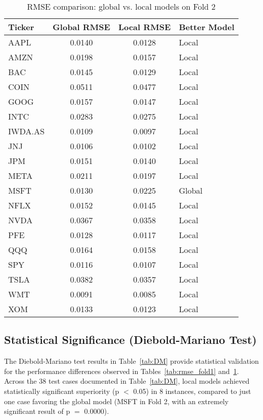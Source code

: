 \documentclass[12pt]{report}
\begin{document}
\begin{table}[h]
\centering
\small
\begin{tabular}{|l|c|c|l|}
\hline
\textbf{Ticker} & \textbf{Global RMSE} & \textbf{Local RMSE} & \textbf{Better Model} \\
\hline
AAPL & 0.0140 & 0.0128 & Local \\
AMZN & 0.0198 & 0.0157 & Local \\
BAC & 0.0145 & 0.0129 & Local \\
COIN & 0.0511 & 0.0477 & Local \\
GOOG & 0.0157 & 0.0147 & Local \\
INTC & 0.0283 & 0.0275 & Local \\
IWDA.AS & 0.0109 & 0.0097 & Local \\
JNJ & 0.0106 & 0.0102 & Local \\
JPM & 0.0151 & 0.0140 & Local \\
META & 0.0211 & 0.0197 & Local \\
MSFT & 0.0130 & 0.0225 & Global \\
NFLX & 0.0152 & 0.0145 & Local \\
NVDA & 0.0367 & 0.0358 & Local \\
PFE & 0.0128 & 0.0117 & Local \\
QQQ & 0.0164 & 0.0158 & Local \\
SPY & 0.0116 & 0.0107 & Local \\
TSLA & 0.0382 & 0.0357 & Local \\
WMT & 0.0091 & 0.0085 & Local \\
XOM & 0.0133 & 0.0123 & Local \\
\hline
\end{tabular}
\caption{RMSE comparison: global vs. local models on Fold 2}
\label{tab:rmse_fold2}
\end{table}


\newpage
\subsection{Statistical Significance (Diebold-Mariano Test)}

The Diebold-Mariano test results in Table~\ref{tab:DM}  provide statistical validation for the performance differences observed in Tables~\ref{tab:rmse_fold1} and~\ref{tab:rmse_fold2}. Across the 38 test cases documented in Table~\ref{tab:DM}, local models achieved statistically significant superiority (p \(<\) 0.05) in 8 instances, compared to just one case favoring the global model (MSFT in Fold 2, with an extremely significant result of p \(=\) 0.0000).\\
\end{document}
